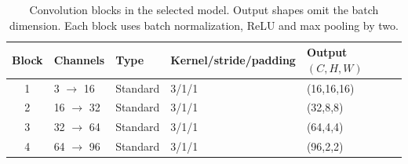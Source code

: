 \begin{table}[htbp]\centering\small
\caption{Convolution blocks in the selected model. Output shapes omit the batch dimension. Each block uses batch normalization, ReLU and max pooling by two.}
\begin{tabular}{@{}cllll@{}}\toprule
Block & Channels & Type & Kernel/stride/padding & Output $(C,H,W)$\\\midrule
1 & 3 $\to$ 16 & Standard & 3/1/1 & (16,16,16)\\
2 & 16 $\to$ 32 & Standard & 3/1/1 & (32,8,8)\\
3 & 32 $\to$ 64 & Standard & 3/1/1 & (64,4,4)\\
4 & 64 $\to$ 96 & Standard & 3/1/1 & (96,2,2)\\
\bottomrule\end{tabular}\end{table}
